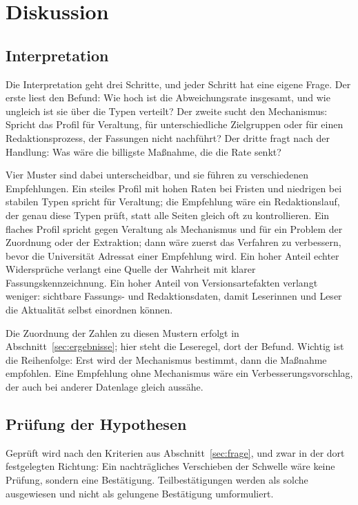 
\section{Diskussion}
\label{sec:diskussion}

\subsection{Interpretation}

Die Interpretation geht drei Schritte, und jeder Schritt hat eine eigene Frage. Der erste
liest den Befund: Wie hoch ist die Abweichungsrate insgesamt, und wie ungleich ist sie über
die Typen verteilt? Der zweite sucht den Mechanismus: Spricht das Profil für Veraltung, für
unterschiedliche Zielgruppen oder für einen Redaktionsprozess, der Fassungen nicht
nachführt? Der dritte fragt nach der Handlung: Was wäre die billigste Maßnahme, die die Rate
senkt?

Vier Muster sind dabei unterscheidbar, und sie führen zu verschiedenen Empfehlungen. Ein
steiles Profil mit hohen Raten bei Fristen und niedrigen bei stabilen Typen spricht für
Veraltung; die Empfehlung wäre ein Redaktionslauf, der genau diese Typen prüft, statt alle
Seiten gleich oft zu kontrollieren. Ein flaches Profil spricht gegen Veraltung als
Mechanismus und für ein Problem der Zuordnung oder der Extraktion; dann wäre zuerst das
Verfahren zu verbessern, bevor die Universität Adressat einer Empfehlung wird. Ein hoher
Anteil echter Widersprüche verlangt eine Quelle der Wahrheit mit klarer
Fassungskennzeichnung. Ein hoher Anteil von Versionsartefakten verlangt weniger: sichtbare
Fassungs- und Redaktionsdaten, damit Leserinnen und Leser die Aktualität selbst einordnen
können.

Die Zuordnung der Zahlen zu diesen Mustern erfolgt in Abschnitt~\ref{sec:ergebnisse}; hier
steht die Leseregel, dort der Befund. Wichtig ist die Reihenfolge: Erst wird der Mechanismus
bestimmt, dann die Maßnahme empfohlen. Eine Empfehlung ohne Mechanismus wäre ein
Verbesserungsvorschlag, der auch bei anderer Datenlage gleich aussähe.

\subsection{Prüfung der Hypothesen}

Geprüft wird nach den Kriterien aus Abschnitt~\ref{sec:frage}, und zwar in der dort
festgelegten Richtung: Ein nachträgliches Verschieben der Schwelle wäre keine Prüfung,
sondern eine Bestätigung. Teilbestätigungen werden als solche ausgewiesen und nicht als
gelungene Bestätigung umformuliert.

